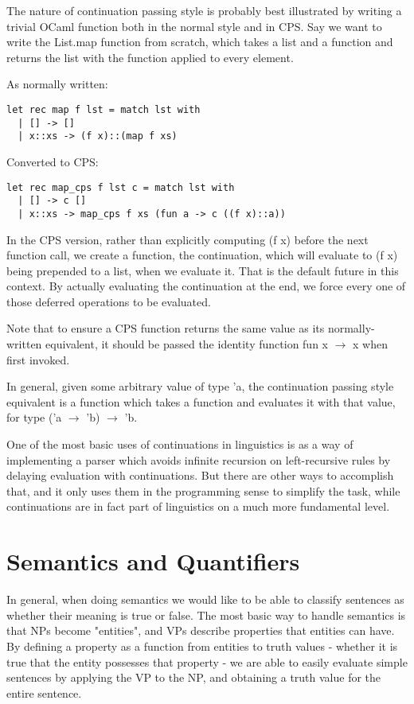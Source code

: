 \documentclass[11pt]{article} %
\begin{document}
The nature of continuation passing style is probably best illustrated by writing a trivial OCaml function both in the normal style and in CPS. Say we want to write the List.map function from scratch, which takes a list and a function and returns the list with the function applied to every element.

As normally written:

\begin{lstlisting}
let rec map f lst = match lst with
  | [] -> []
  | x::xs -> (f x)::(map f xs)
\end{lstlisting}

Converted to CPS:

\begin{lstlisting}
let rec map_cps f lst c = match lst with
  | [] -> c []
  | x::xs -> map_cps f xs (fun a -> c ((f x)::a))
\end{lstlisting}

In the CPS version, rather than explicitly computing (f x) before the next function call, we create a function, the continuation, which will evaluate to (f x) being prepended to a list, when we evaluate it. That is the default future in this context. By actually evaluating the continuation at the end, we force every one of those deferred operations to be evaluated.

Note that to ensure a CPS function returns the same value as its normally-written equivalent, it should be passed the identity function fun x $\rightarrow$ x when first invoked.

In general, given some arbitrary value of type 'a, the continuation passing style equivalent is a function which takes a function and evaluates it with that value, for type ('a $\rightarrow$ 'b) $\rightarrow$ 'b.

One of the most basic uses of continuations in linguistics is as a way of implementing a parser which avoids infinite recursion on left-recursive rules by delaying evaluation with continuations. But there are other ways to accomplish that, and it only uses them in the programming sense to simplify the task, while continuations are in fact part of linguistics on a much more fundamental level.

\section{Semantics and Quantifiers}

In general, when doing semantics we would like to be able to classify sentences as whether their meaning is true or false. The most basic way to handle semantics is that NPs become "entities", and VPs describe properties that entities can have. By defining a property as a function from entities to truth values - whether it is true that the entity possesses that property - we are able to easily evaluate simple sentences by applying the VP to the NP, and obtaining a truth value for the entire sentence.
\end{document}
